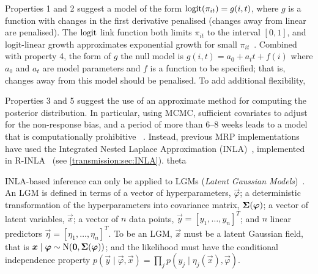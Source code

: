 \documentclass[thesis.tex]{subfiles}
\begin{document}
Properties 1 and 2 suggest a model of the form $\operatorname{logit}(\pi_{it}) = g(i, t)$, where $g$ is a function with changes in the first derivative penalised (\ie changes away from linear are penalised).
The $\operatorname{logit}$ link function both limits $\pi_{it}$ to the interval $[0, 1]$, and logit-linear growth approximates exponential growth for small $\pi_{it}$~\autocite{ealesAppropriately}.
Combined with property 4, the form of $g$ the null model is $g(i, t) = a_0 + a_t t + f(i)$ where $a_0$ and $a_t$ are model parameters and $f$ is a function to be specified; that is, changes away from this model should be penalised.
To add additional flexibility, 



Properties 3 and 5 suggest the use of an approximate method for computing the posterior distribution.
In particular, using MCMC, sufficient covariates to adjust for the non-response bias, and a period of more than 6--8 weeks leads to a model that is computationally prohibitive ~.
Instead, previous MRP implementations have used the Integrated Nested Laplace Approximation (INLA)~\autocite{rueINLA}, implemented in R-INLA~\autocite{RINLA} (see \cref{transmission:sec:INLA}).
theta

INLA-based inference can only be applied to LGMs (\emph{Latent Gaussian Models})~\autocite{rueINLAseminar,rueINLA,martinoINLAtutorial}.
An LGM is defined in terms of a vector of hyperparameters, $\vec{\varphi}$; a deterministic transformation of the hyperparameters into covariance matrix, $\bm{\Sigma}(\bm{\varphi})$; a vector of latent variables, $\vec{x}$; a vector of $n$ data points, $\vec{y} = [y_1, \dots, y_n]^T$; and $n$ linear predictors $\vec{\eta} = [\eta_1, \dots, \eta_n]^T$.
To be an LGM, $\vec{x}$ must be a latent Gaussian field, that is $\bm{x} \mid \bm{\varphi} \sim \operatorname{N}(\bm{0}, \bm{\Sigma}(\bm{\varphi}))$; and the likelihood must have the conditional independence property $p(\vec{y} \mid \vec{\varphi}, \vec{x}) = \prod_j p(y_j \mid \eta_j(\vec{x}), \vec{\varphi})$.
\end{document}
